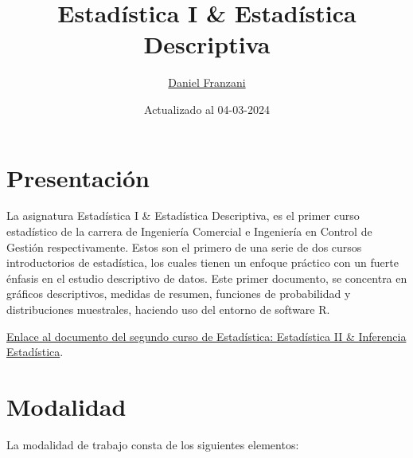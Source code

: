 \documentclass[
  11pt,
]{book}
\title{Estadística I \& Estadística Descriptiva}
\author{\href{https://dfranzani.github.io/website/principal/home.html}{Daniel Franzani}}
\date{Actualizado al 04-03-2024}
\theoremstyle{definition}
\theoremstyle{definition}
\theoremstyle{definition}
\theoremstyle{definition}
\theoremstyle{remark}
\begin{document}
\maketitle

{
\setcounter{tocdepth}{3}
\tableofcontents
}
\chapter*{Presentación}\label{presentaciuxf3n}

La asignatura Estadística I \& Estadística Descriptiva, es el primer curso estadístico de la carrera de Ingeniería Comercial e Ingeniería en Control de Gestión respectivamente. Estos son el primero de una serie de dos cursos introductorios de estadística, los cuales tienen un enfoque práctico con un fuerte énfasis en el estudio descriptivo de datos. Este primer documento, se concentra en gráficos descriptivos, medidas de resumen, funciones de probabilidad y distribuciones muestrales, haciendo uso del entorno de software R.

\href{https://dfranzani.github.io/Estadistica_II/}{Enlace al documento del segundo curso de Estadística: Estadística II \& Inferencia Estadística}.

\chapter*{Modalidad}\label{modalidad}

La modalidad de trabajo consta de los siguientes elementos:
\end{document}
